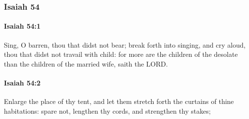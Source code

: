 	\subsubsection{Isaiah 54} %
		\label{ISAIAH-54}

		\paragraph{Isaiah 54:1} %
			\label{ISAIAH-54-1}

			Sing, O barren, thou that didst not bear; break forth into singing, and cry aloud, thou that didst not travail with child: for more are the children of the desolate than the children of the married wife, saith the LORD.


		\paragraph{Isaiah 54:2} %
			\label{ISAIAH-54-2}

			Enlarge the place of thy tent, and let them stretch forth the curtains of thine habitations: spare not, lengthen thy cords, and strengthen thy stakes;

